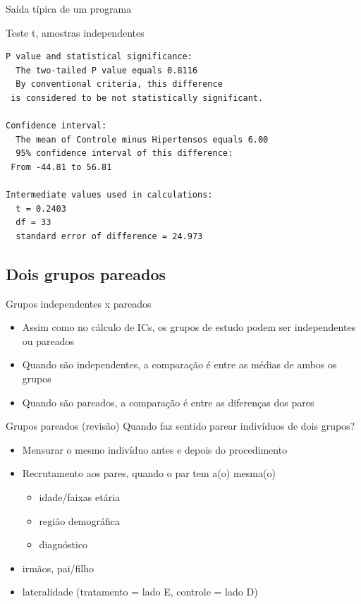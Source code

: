 \documentclass{beamer}
\begin{document}
\begin{frame}[fragile]{Saída típica de um programa}
  \begin{exampleblock}{Teste t, amostras independentes}
    \footnotesize
\begin{verbatim}
P value and statistical significance: 
  The two-tailed P value equals 0.8116 
  By conventional criteria, this difference
 is considered to be not statistically significant. 

Confidence interval: 
  The mean of Controle minus Hipertensos equals 6.00 
  95% confidence interval of this difference:
 From -44.81 to 56.81 

Intermediate values used in calculations: 
  t = 0.2403 
  df = 33 
  standard error of difference = 24.973 
\end{verbatim}
  \end{exampleblock}
\end{frame}


\subsection{Dois grupos pareados}

\begin{frame}{Grupos independentes x pareados}
  \begin{itemize}
  \item Assim como no cálculo de ICs, os grupos de estudo podem ser independentes ou pareados
  \item Quando são independentes, a comparação é entre as médias de ambos os grupos
  \item Quando são pareados, a comparação é entre as diferenças dos pares
  \end{itemize}
\end{frame}


\begin{frame}{Grupos pareados (revisão)}
Quando faz sentido parear indivíduos de dois grupos?
  \begin{itemize}
  \item Mensurar o \alert{mesmo} indivíduo antes e depois do procedimento
  \item Recrutamento aos pares, quando o par tem a(o) mesma(o)
    \begin{itemize}
    \item idade/faixas etária
    \item região demográfica
    \item diagnóstico
    \end{itemize}
  \item irmãos, pai/filho
  \item lateralidade (tratamento = lado E, controle = lado D)
  \end{itemize}
\end{frame}
\end{document}
